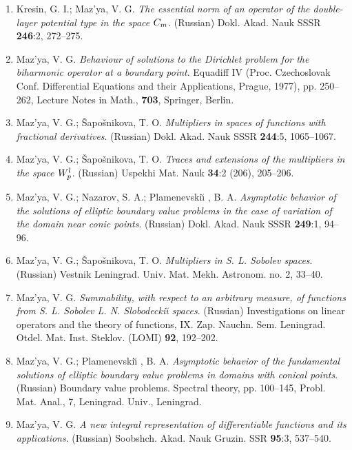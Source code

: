 \documentclass{article}
\begin{document}
\begin{enumerate}
{\bf 1979}
\item Kresin, G. I.; Maz'ya, V. G. {\it The essential norm of an
operator
of the double-layer potential type
in the space $C\sb{m}$}. (Russian) Dokl. Akad. Nauk SSSR {\bf 246}:2,
272--275.
\item Maz'ya, V. G. {\it Behaviour of solutions to the Dirichlet
problem
for the biharmonic operator at a
boundary point}. Equadiff IV (Proc. Czechoslovak Conf. Differential
Equations and their Applications, Prague, 1977), pp. 250--262,
Lecture Notes in Math., {\bf 703}, Springer, Berlin.
\item Maz'ya, V. G.; \v Sapo\v snikova, T. O. {\it Multipliers in
spaces of
functions with fractional derivatives}.
(Russian) Dokl. Akad. Nauk SSSR {\bf 244}:5, 1065--1067.
\item Maz'ya, V. G.; \v Sapo\v snikova, T. O. {\it Traces and
extensions of
the multipliers in the
space $W\sb{p}\sp{l}$}. (Russian) Uspekhi Mat. Nauk {\bf 34}:2 (206),
205--206.
\item Maz'ya, V. G.; Nazarov, S. A.; Plamenevski{\u\i} , B. A. {\it
Asymptotic behavior of the solutions of
elliptic boundary value problems in the case of variation of the
domain
near conic points}. (Russian) Dokl. Akad. Nauk SSSR {\bf
249}:1, 94--96.
\item Maz'ya, V. G.; \v Sapo\v snikova, T. O. {\it Multipliers in S.
L.
Sobolev spaces}.
(Russian) Vestnik Leningrad. Univ. Mat. Mekh. Astronom. no. 2, 33--40.
\item Maz'ya, V. G. {\it Summability, with respect to an arbitrary
measure,
of functions from S. L. Sobolev L. N.
Slobodecki{\u\i} spaces}. (Russian) Investigations on linear operators
and
the theory of functions, IX. Zap. Nauchn. Sem. Leningrad.
Otdel. Mat. Inst. Steklov. (LOMI) {\bf 92}, 192--202.
\item Maz'ya, V. G.; Plamenevski{\u\i} , B. A. {\it Asymptotic
behavior of
the fundamental solutions of
elliptic boundary value problems in domains with conical points}.
(Russian)
Boundary value problems. Spectral theory, pp.
100--145, Probl. Mat. Anal., 7, Leningrad. Univ., Leningrad.

\item Maz'ya, V. G. {\it A new integral representation of
differentiable
functions and its applications}.
(Russian) Soobshch. Akad. Nauk Gruzin. SSR {\bf 95}:3, 537--540.



\end{enumerate}
\end{document}
